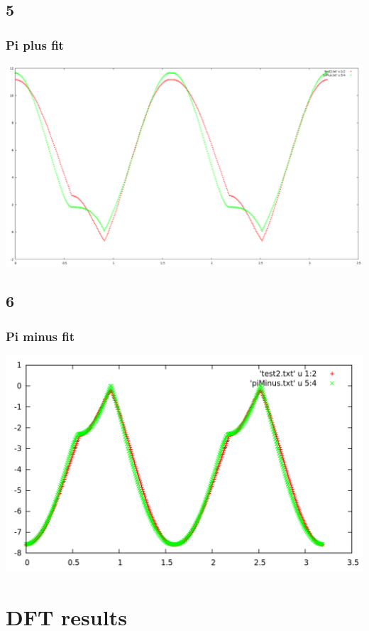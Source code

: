 \documentclass{beamer}
\begin{document}
	\subsection*{5}
		\begin{frame}
			\frametitle{Pi plus fit}
			\includegraphics[width=\textwidth]{figures/fit1.png}
		\end{frame}

	\subsection*{6}
		\begin{frame}
			\frametitle{Pi minus fit}
			\includegraphics[width=\textwidth]{figures/fit2.png}
		\end{frame}


\section{DFT results}
	
\end{document}

